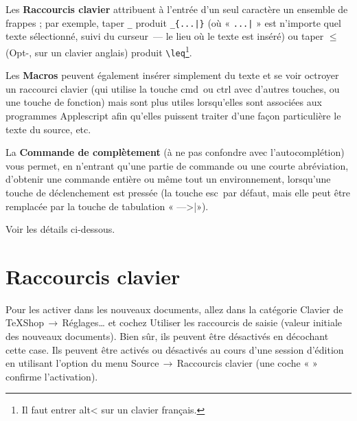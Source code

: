 \documentclass[11pt,french]{article}
\newcommand{\optkey}{\textsf{alt}}
\newcommand{\cmdkey}{\textsf{cmd}}
\newcommand{\esckey}{\textsf{esc}}
\newcommand{\tabkey}{---\kern-5pt>|}
\newcommand{\mnu}[1]{\textsf{#1}}
\newcommand{\cmd}[1]{\textsf{#1}}
\newcommand{\To}{\,\(\to\)\,}
\begin{document}
Les \textbf{\cmd{Raccourcis clavier}} attribuent à l'entrée d'un seul caractère un ensemble de frappes ; par exemple, taper \verb+_+ produit \verb+_{...|}+ (où « \verb+...|+ » est n'importe quel texte sélectionné, suivi du curseur~--- le lieu où le texte est inséré) ou taper \(\leq\) (\cmd{Opt-,} sur un clavier anglais) produit \verb+\leq+\footnote{Il faut entrer \optkey< sur un clavier français.}.

Les \textbf{\cmd{Macros}} peuvent également insérer simplement du texte et se voir octroyer un raccourci clavier (qui utilise la touche \cmdkey\ ou ctrl avec d'autres touches, ou une touche de fonction) mais sont plus utiles lorsqu'elles sont associées aux programmes Applescript afin qu'elles puissent traiter d'une façon particulière le texte du source, etc.

La \textbf{\cmd{Commande de complètement}} (à ne pas confondre avec l'\cmd{autocomplétion}\setcounter{footnote}{0}\footnotemark) vous permet, en n'entrant qu'une partie de commande ou une courte abréviation, d'obtenir une commande entière ou même tout un environnement, lorsqu'une touche de déclenchement est pressée (la touche \esckey\ par défaut, mais elle peut être remplacée par la touche de tabulation « \tabkey »).

Voir les détails ci-dessous.

\section{\cmd{Raccourcis clavier}}

%

Pour les activer dans les nouveaux documents, allez dans la catégorie \mnu{Clavier} de \mnu{TeXShop}\To\mnu{Réglages…} et cochez \mnu{Utiliser les raccourcis de saisie (valeur initiale des nouveaux documents)}. Bien sûr, ils peuvent être désactivés en décochant cette case. Ils peuvent être activés ou désactivés au cours d'une session d'édition en utilisant l'option du menu \mnu{Source}\To\mnu{Raccourcis clavier} (une coche « \checkmark » confirme l'activation).
\end{document}
